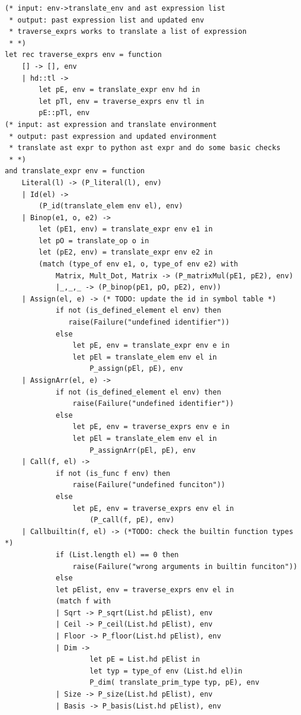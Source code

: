 \documentclass[12pt]{article} %
\begin{document}
\begin{lstlisting}[style=appendix, caption=translate.ml]
(* input: env->translate_env and ast expression list
 * output: past expression list and updated env
 * traverse_exprs works to translate a list of expression 
 * *)
let rec traverse_exprs env = function
    [] -> [], env
    | hd::tl -> 
        let pE, env = translate_expr env hd in
        let pTl, env = traverse_exprs env tl in
        pE::pTl, env
(* input: ast expression and translate environment
 * output: past expression and updated environment
 * translate ast expr to python ast expr and do some basic checks
 * *)
and translate_expr env = function 
    Literal(l) -> (P_literal(l), env)
    | Id(el) -> 
        (P_id(translate_elem env el), env)
    | Binop(e1, o, e2) -> 
        let (pE1, env) = translate_expr env e1 in
        let pO = translate_op o in
        let (pE2, env) = translate_expr env e2 in
        (match (type_of env e1, o, type_of env e2) with
            Matrix, Mult_Dot, Matrix -> (P_matrixMul(pE1, pE2), env)
            |_,_,_ -> (P_binop(pE1, pO, pE2), env))
    | Assign(el, e) -> (* TODO: update the id in symbol table *) 
            if not (is_defined_element el env) then
               raise(Failure("undefined identifier"))
            else
                let pE, env = translate_expr env e in
                let pEl = translate_elem env el in    
                    P_assign(pEl, pE), env
    | AssignArr(el, e) -> 
            if not (is_defined_element el env) then
                raise(Failure("undefined identifier"))
            else
                let pE, env = traverse_exprs env e in
                let pEl = translate_elem env el in    
                    P_assignArr(pEl, pE), env
    | Call(f, el) -> 
            if not (is_func f env) then
                raise(Failure("undefined funciton"))
            else
                let pE, env = traverse_exprs env el in
                    (P_call(f, pE), env)
    | Callbuiltin(f, el) -> (*TODO: check the builtin function types *) 
            if (List.length el) == 0 then
                raise(Failure("wrong arguments in builtin funciton"))
            else
            let pElist, env = traverse_exprs env el in
            (match f with
            | Sqrt -> P_sqrt(List.hd pElist), env
            | Ceil -> P_ceil(List.hd pElist), env
            | Floor -> P_floor(List.hd pElist), env 
            | Dim -> 
                    let pE = List.hd pElist in 
                    let typ = type_of env (List.hd el)in
                    P_dim( translate_prim_type typ, pE), env
            | Size -> P_size(List.hd pElist), env
            | Basis -> P_basis(List.hd pElist), env

\end{lstlisting}
\end{document}
